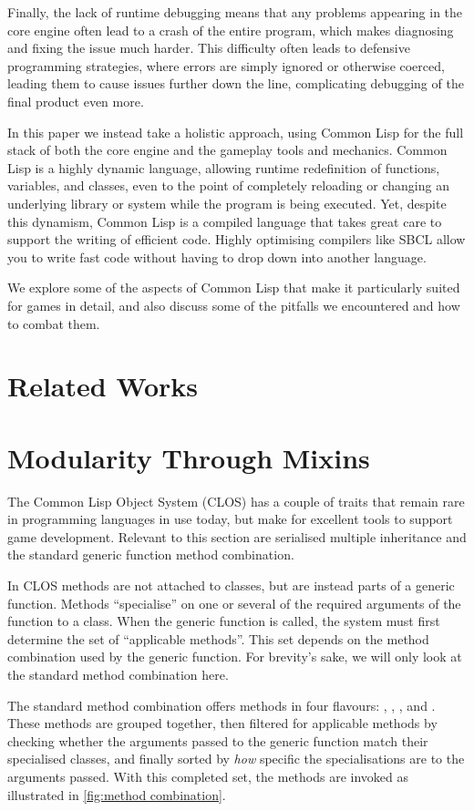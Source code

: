 \documentclass[a4paper]{paper}
\begin{document}
Finally, the lack of runtime debugging means that any problems appearing in the core engine often lead to a crash of the entire program, which makes diagnosing and fixing the issue much harder. This difficulty often leads to defensive programming strategies, where errors are simply ignored or otherwise coerced, leading them to cause issues further down the line, complicating debugging of the final product even more.

In this paper we instead take a holistic approach, using Common Lisp for the full stack of both the core engine and the gameplay tools and mechanics. Common Lisp is a highly dynamic language, allowing runtime redefinition of functions, variables, and classes, even to the point of completely reloading or changing an underlying library or system while the program is being executed. Yet, despite this dynamism, Common Lisp is a compiled language that takes great care to support the writing of efficient code. Highly optimising compilers like SBCL allow you to write fast code without having to drop down into another language.

We explore some of the aspects of Common Lisp that make it particularly suited for games in detail, and also discuss some of the pitfalls we encountered and how to combat them.

\section{Related Works}


\section{Modularity Through Mixins}
The Common Lisp Object System (CLOS) has a couple of traits that remain rare in programming languages in use today, but make for excellent tools to support game development. Relevant to this section are serialised multiple inheritance and the standard generic function method combination.

In CLOS methods are not attached to classes, but are instead parts of a generic function. Methods ``specialise'' on one or several of the required arguments of the function to a class. When the generic function is called, the system must first determine the set of ``applicable methods''. This set depends on the method combination used by the generic function. For brevity's sake, we will only look at the standard method combination here.

The standard method combination offers methods in four flavours: , , , and . These methods are grouped together, then filtered for applicable methods by checking whether the arguments passed to the generic function match their specialised classes, and finally sorted by \textit{how} specific the specialisations are to the arguments passed. With this completed set, the methods are invoked as illustrated in \autoref{fig:method combination}.
\end{document}
